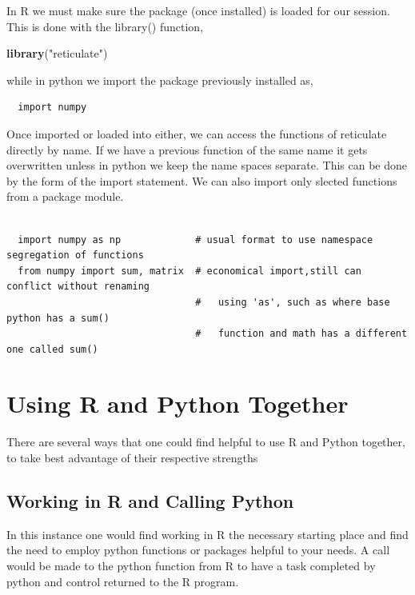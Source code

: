 \documentclass[]{book}
\newenvironment{Shaded}{\begin{snugshade}}{\end{snugshade}}
\newcommand{\KeywordTok}[1]{\textcolor[rgb]{0.13,0.29,0.53}{\textbf{#1}}}
\newcommand{\StringTok}[1]{\textcolor[rgb]{0.31,0.60,0.02}{#1}}
\newcommand{\NormalTok}[1]{#1}
\theoremstyle{definition}
\theoremstyle{definition}
\theoremstyle{definition}
\theoremstyle{remark}
\begin{document}
In R we must make sure the package (once installed) is loaded for our
session. This is done with the library() function,

\begin{Shaded}
\begin{Highlighting}[]
  \KeywordTok{library}\NormalTok{(}\StringTok{"reticulate"}\NormalTok{)}
\end{Highlighting}
\end{Shaded}

while in python we import the package previously installed as,

\begin{verbatim}
  import numpy
\end{verbatim}

Once imported or loaded into either, we can access the functions of
reticulate directly by name. If we have a previous function of the same
name it gets overwritten unless in python we keep the name spaces
separate. This can be done by the form of the import statement. We can
also import only slected functions from a package module.

\begin{verbatim}

  import numpy as np             # usual format to use namespace segregation of functions
  from numpy import sum, matrix  # economical import,still can conflict without renaming 
                                 #   using 'as', such as where base python has a sum()  
                                 #   function and math has a different one called sum()
\end{verbatim}

\section{Using R and Python Together}\label{using-r-and-python-together}

There are several ways that one could find helpful to use R and Python
together, to take best advantage of their respective strengths

\subsection{Working in R and Calling
Python}\label{working-in-r-and-calling-python}

In this instance one would find working in R the necessary starting
place and find the need to employ python functions or packages helpful
to your needs. A call would be made to the python function from R to
have a task completed by python and control returned to the R program.
\end{document}
